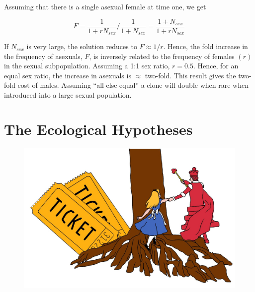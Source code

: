 \documentclass[
  letterpaper,
]{book}
\begin{document}
\begin{tcolorbox}
Assuming that there is a single asexual female at time one, we get

\[F = \frac{1}{1 + rN_{sex}}/\frac{1}{1 + N_{sex}} = \frac{1 + N_{sex}}{1 + rN_{sex}}\]

If \(N_{sex}\) is very large, the solution reduces to \(F \approx 1/r\).
Hence, the fold increase in the frequency of asexuals, \(F\), is
inversely related to the frequency of females \((r)\) in the sexual
subpopulation. Assuming a 1:1 sex ratio, \(r = 0.5\). Hence, for an
equal sex ratio, the increase in asexuals is \(\approx\) two-fold. This
result gives the two-fold cost of males. Assuming ``all-else-equal'' a
clone will double when rare when introduced into a large sexual
population.

\end{tcolorbox}


\hypertarget{sec-eco-hyp}{%
\chapter{The Ecological Hypotheses}\label{sec-eco-hyp}}

\begin{figure}

{\centering \includegraphics{images/fig2-1.jpeg}

}

\end{figure}
\end{document}
